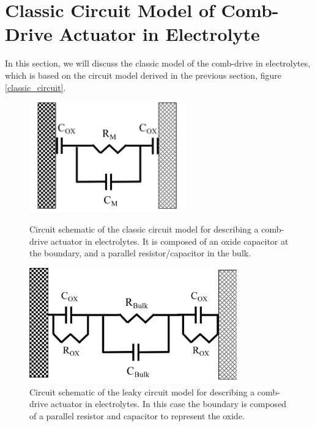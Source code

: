 \section{Classic Circuit Model of Comb-Drive Actuator in Electrolyte}
In this section, we will discuss the classic model of the comb-drive in electrolytes, which is based on the circuit model derived in the previous section, figure \ref{classic_circuit}.

\begin{figure}[htpb]
    \centering
    \begin{minipage}{\textwidth}
        \centering
        \includegraphics[width=0.6\textwidth]{Chapter3/figure/classic_circuit.png} %
        \caption{Circuit schematic of the classic circuit model for describing a comb-drive actuator in electrolytes. It is composed of an oxide capacitor at the boundary, and a parallel resistor/capacitor in the bulk.}\label{classic_circuit}
    \end{minipage}\vfill
    \begin{minipage}{\textwidth}
        \centering
        \includegraphics[width=0.8\textwidth]{Chapter3/figure/leaky_ox_circuit.png} %
        \caption{Circuit schematic of the leaky circuit model for describing a comb-drive actuator in electrolytes. In this case the boundary is composed of a parallel resistor and capacitor to represent the oxide.}\label{leaky_ox_circuit}

\end{minipage}
\end{figure}
